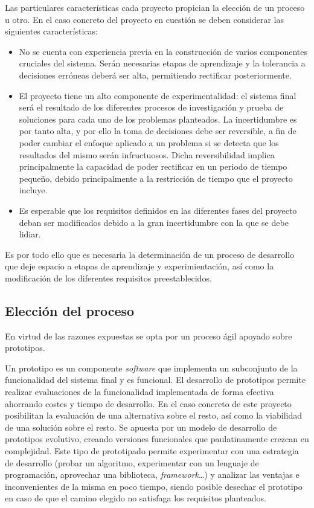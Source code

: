 Las particulares características cada proyecto propician la elección de un proceso u otro. En el caso concreto del proyecto en cuestión se deben considerar las siguientes características:

\begin{itemize}

\item No se cuenta con experiencia previa en la construcción de varios componentes cruciales del sistema. Serán necesarias etapas de aprendizaje y la tolerancia a decisiones erróneas deberá ser alta, permitiendo rectificar posteriormente.

\item El proyecto tiene un alto componente de experimentalidad: el sistema final será el resultado de los diferentes procesos de investigación y prueba de soluciones para cada uno de los problemas planteados. La incertidumbre es por tanto alta, y por ello la toma de decisiones debe ser reversible, a fin de poder cambiar el enfoque aplicado a un problema si se detecta que los resultados del mismo serán infructuosos. Dicha reversibilidad implica principalmente la capacidad de poder rectificar en un periodo de tiempo pequeño, debido principalmente a la restricción de tiempo que el proyecto incluye.

\item Es esperable que los requisitos definidos en las diferentes fases del proyecto deban ser modificados debido a la gran incertidumbre con la que se debe lidiar.

\end{itemize}

Es por todo ello que es necesaria la determinación de un proceso de desarrollo que deje espacio a etapas de aprendizaje y experimientación, así como la modificación de los diferentes requisitos preestablecidos. 

\subsection{Elección del proceso}

En virtud de las razones expuestas se opta por un proceso ágil apoyado sobre prototipos. 

Un prototipo es un componente \textit{software} que implementa un subconjunto de la funcionalidad del sistema final y es funcional. El desarrollo de prototipos permite realizar evaluaciones de la funcionalidad implementada de forma efectiva ahorrando costes y tiempo de desarrollo. En el caso concreto de este proyecto posibilitan la evaluación de una alternativa sobre el resto, así como la viabilidad de una solución sobre el resto. Se apuesta por un modelo de desarrollo de prototipos evolutivo\cite{10.1109/TSE.1975.6312870}, creando versiones funcionales que paulatinamente crezcan en complejidad. Este tipo de prototipado permite experimentar con una estrategia de desarrollo (probar un algoritmo, experimentar con un lenguaje de programación, aprovechar una biblioteca, \textit{framework}\dots) y analizar las ventajas e inconvenientes de la misma en poco tiempo, siendo posible desechar el prototipo en caso de que el camino elegido no satisfaga los requisitos planteados.

